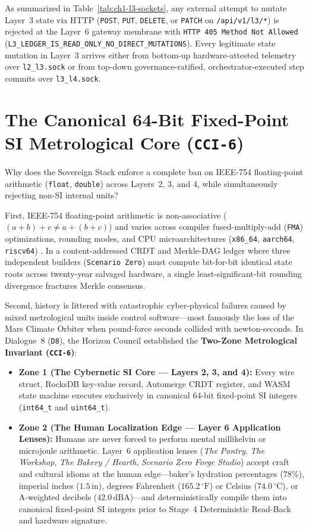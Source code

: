As summarized in Table~\ref{tab:ch1-l3-sockets}, any external attempt to mutate Layer~3 state via HTTP (\texttt{POST}, \texttt{PUT}, \texttt{DELETE}, or \texttt{PATCH} on \texttt{/api/v1/l3/*}) is rejected at the Layer~6 gateway membrane with \texttt{HTTP 405 Method Not Allowed} (\texttt{L3\_LEDGER\_IS\_READ\_ONLY\_NO\_DIRECT\_MUTATIONS}). Every legitimate state mutation in Layer~3 arrives either from bottom-up hardware-attested telemetry over \texttt{l2\_l3.sock} or from top-down governance-ratified, orchestrator-executed step commits over \texttt{l3\_l4.sock}.

\section{The Canonical 64-Bit Fixed-Point SI Metrological Core (\texttt{CCI-6})}
\label{sec:ch1-si-core}

Why does the Sovereign Stack enforce a complete ban on IEEE-754 floating-point arithmetic (\texttt{float}, \texttt{double}) across Layers~2, 3, and 4, while simultaneously rejecting non-SI internal units?

First, IEEE-754 floating-point arithmetic is non-associative ($(a + b) + c \neq a + (b + c)$) and varies across compiler fused-multiply-add (\texttt{FMA}) optimizations, rounding modes, and CPU microarchitectures (\texttt{x86\_64}, \texttt{aarch64}, \texttt{riscv64}) \parencite{goldberg1991float}. In a content-addressed CRDT and Merkle-DAG ledger where three independent builders (\texttt{Scenario Zero}) must compute bit-for-bit identical state roots across twenty-year salvaged hardware, a single least-significant-bit rounding divergence fractures Merkle consensus.

Second, history is littered with catastrophic cyber-physical failures caused by mixed metrological units inside control software---most famously the loss of the Mars Climate Orbiter when pound-force seconds collided with newton-seconds. In Dialogue~8 (\texttt{D8}), the Horizon Council established the \textbf{Two-Zone Metrological Invariant (\texttt{CCI-6})}:
\begin{itemize}
    \item \textbf{Zone 1 (The Cybernetic SI Core — Layers 2, 3, and 4):} Every wire struct, RocksDB key-value record, Automerge CRDT register, and WASM state machine executes exclusively in canonical 64-bit fixed-point SI integers (\texttt{int64\_t} and \texttt{uint64\_t}).
    \item \textbf{Zone 2 (The Human Localization Edge — Layer 6 Application Lenses):} Humans are never forced to perform mental millikelvin or microjoule arithmetic. Layer~6 application lenses (\textit{The Pantry}, \textit{The Workshop}, \textit{The Bakery / Hearth}, \textit{Scenario Zero Forge Studio}) accept craft and cultural idioms at the human edge---baker's hydration percentages ($78\%$), imperial inches ($1.5\,\mathrm{in}$), degrees Fahrenheit ($165.2\,^\circ\mathrm{F}$) or Celsius ($74.0\,^\circ\mathrm{C}$), or A-weighted decibels ($42.0\,\mathrm{dBA}$)---and deterministically compile them into canonical fixed-point SI integers prior to Stage~4 Deterministic Read-Back and hardware signature.
\end{itemize}

